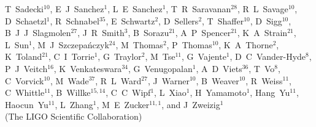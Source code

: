 \documentclass[12pt]{iopart}
\begin{document}
{T~Sadecki$^{10}$,  %
E~J~Sanchez$^{1}$,  %
L~E~Sanchez$^{1}$,  %
T~R~Saravanan$^{28}$,  %
R~L~Savage$^{10}$,  %
D~Schaetzl$^{1}$,  %
R~Schnabel$^{35}$,  %
E~Schwartz$^{2}$,  %
D~Sellers$^{2}$,  %
T~Shaffer$^{10}$,  %
D~Sigg$^{10}$,  %
B~J~J~Slagmolen$^{27}$,  %
J~R~Smith$^{3}$,  %
B~Sorazu$^{21}$,  %
A~P~Spencer$^{21}$,  %
K~A~Strain$^{21}$,  %
L~Sun$^{1}$,  %
M~J~Szczepa\'nczyk$^{24}$,  %
M~Thomas$^{2}$,  %
P~Thomas$^{10}$,  %
K~A~Thorne$^{2}$,  %
K~Toland$^{21}$,  %
C~I~Torrie$^{1}$,  %
G~Traylor$^{2}$,  %
M~Tse$^{11}$,  %
G~Vajente$^{1}$,  %
D~C~Vander-Hyde$^{8}$,  %
P~J~Veitch$^{16}$,  %
K~Venkateswara$^{34}$,  %
G~Venugopalan$^{1}$,  %
A~D~Viets$^{36}$,  %
T~Vo$^{8}$,  %
C~Vorvick$^{10}$,  %
M~Wade$^{37}$,  %
R~L~Ward$^{27}$,  %
J~Warner$^{10}$,  %
B~Weaver$^{10}$,  %
R~Weiss$^{11}$,  %
C~Whittle$^{11}$,  %
B~Willke$^{15,14}$,  %
C~C~Wipf$^{1}$,  %
L~Xiao$^{1}$,  %
H~Yamamoto$^{1}$,  %
Hang~Yu$^{11}$,  %
Haocun~Yu$^{11}$,  %
L~Zhang$^{1}$,  %
M~E~Zucker$^{11,1}$,  %
and
J~Zweizig$^{1}$%
\\
{(The LIGO Scientific Collaboration)}%
}%
\par\medskip
\address {$^{1}$LIGO, California Institute of Technology, Pasadena, CA 91125, USA }
\address {$^{2}$LIGO Livingston Observatory, Livingston, LA 70754, USA }
\address {$^{3}$California State University Fullerton, Fullerton, CA 92831, USA }
\address {$^{4}$Columbia University, New York, NY 10027, USA }
\address {$^{5}$Louisiana State University, Baton Rouge, LA 70803, USA }
\address {$^{6}$Christopher Newport University, Newport News, VA 23606, USA }
\address {$^{7}$University of Oregon, Eugene, OR 97403, USA }
\address {$^{8}$Syracuse University, Syracuse, NY 13244, USA }
\address {$^{9}$University of Minnesota, Minneapolis, MN 55455, USA }
\address {$^{10}$LIGO Hanford Observatory, Richland, WA 99352, USA }
\address {$^{11}$LIGO, Massachusetts Institute of Technology, Cambridge, MA 02139, USA }
\address {$^{12}$Stanford University, Stanford, CA 94305, USA }
\end{document}
